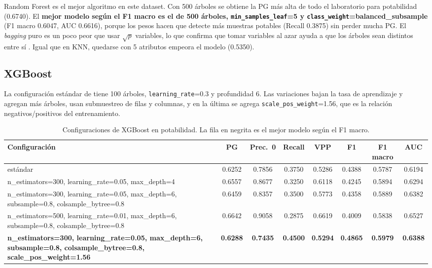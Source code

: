 \documentclass[11pt,a4paper]{article}
\let\citepOriginal\citep
\renewcommand*{\citep}[1]{\textbf{\citepOriginal{#1}}}%
\let\citetOriginal\citet
\renewcommand*{\citet}[1]{\textbf{\citetOriginal{#1}}}%
\begin{document}
Random Forest es el mejor algoritmo en este dataset. Con 500 árboles se obtiene la PG más alta de todo el laboratorio para potabilidad (0.6740). El \textbf{mejor modelo según el F1 macro es el de 500 árboles, \texttt{min\_samples\_leaf}=5 y \texttt{class\_weight}=balanced\_subsample} (F1 macro 0.6047, AUC 0.6616), porque los pesos hacen que detecte más muestras potables (Recall 0.3875) sin perder mucha PG. El \textit{bagging} puro es un poco peor que usar $\sqrt{p}$ variables, lo que confirma que tomar variables al azar ayuda a que los árboles sean distintos entre sí \citep{breiman2001}. Igual que en KNN, quedarse con 5 atributos empeora el modelo (0.5350).

\subsection{XGBoost}
La configuración estándar de \citet{chen2016} tiene 100 árboles, \texttt{learning\_rate}=0.3 y profundidad 6. Las variaciones bajan la tasa de aprendizaje y agregan más árboles, usan submuestreo de filas y columnas, y en la última se agrega \texttt{scale\_pos\_weight}=1.56, que es la relación negativos/positivos del entrenamiento.

\begin{table}[H]
\centering
\small
\caption{Configuraciones de XGBoost en potabilidad. La fila en negrita es el mejor modelo según el F1 macro.}
\setlength{\tabcolsep}{4pt}
\begin{tabular}{>{\raggedright\arraybackslash}p{4.9cm}ccccccc}
\toprule
Configuración & PG & Prec.\ 0 & Recall & VPP & F1 & F1 macro & AUC \\
\midrule
estándar & 0.6252 & 0.7856 & 0.3750 & 0.5286 & 0.4388 & 0.5787 & 0.6194 \\
n\_estimators=\allowbreak{}300, \allowbreak learning\_rate=\allowbreak{}0.05, \allowbreak max\_depth=\allowbreak{}4 & 0.6557 & 0.8677 & 0.3250 & 0.6118 & 0.4245 & 0.5894 & 0.6294 \\
n\_estimators=\allowbreak{}300, \allowbreak learning\_rate=\allowbreak{}0.05, \allowbreak max\_depth=\allowbreak{}6, \allowbreak subsample=\allowbreak{}0.8, \allowbreak colsample\_bytree=\allowbreak{}0.8 & 0.6459 & 0.8357 & 0.3500 & 0.5773 & 0.4358 & 0.5889 & 0.6382 \\
n\_estimators=\allowbreak{}500, \allowbreak learning\_rate=\allowbreak{}0.01, \allowbreak max\_depth=\allowbreak{}6, \allowbreak subsample=\allowbreak{}0.8, \allowbreak colsample\_bytree=\allowbreak{}0.8 & 0.6642 & 0.9058 & 0.2875 & 0.6619 & 0.4009 & 0.5838 & 0.6527 \\
\textbf{n\_estimators=\allowbreak{}300, \allowbreak learning\_rate=\allowbreak{}0.05, \allowbreak max\_depth=\allowbreak{}6, \allowbreak subsample=\allowbreak{}0.8, \allowbreak colsample\_bytree=\allowbreak{}0.8, \allowbreak scale\_pos\_weight=\allowbreak{}1.56} & \textbf{0.6288} & \textbf{0.7435} & \textbf{0.4500} & \textbf{0.5294} & \textbf{0.4865} & \textbf{0.5979} & \textbf{0.6388} \\
\bottomrule
\end{tabular}
\end{table}
\end{document}
